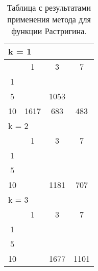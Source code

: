\begin{table}
  \centering
  \begin{tabular}{|*4{c|}}
  \hline
  \multicolumn{4}{|l|}{k = 1} \\
  \hline
  \diagbox{$\mu$}{$\lambda$} & \multicolumn{1}{c|}{1} & \multicolumn{1}{c|}{3} & \multicolumn{1}{c|}{7} \\
  \hline
  1& \cellcolor{olive}{5124} & \cellcolor{olive}{2301} & \cellcolor{olive}{1411} \\
  \hline
  5& \cellcolor{olive}{1859} & 1053 & \cellcolor{olive}{401} \\
  \hline
  10 & 1617 & 683 & 483 \\
  \hline
  \multicolumn{4}{|l|}{k = 2} \\
  \hline
  \diagbox{$\mu$}{$\lambda$} & \multicolumn{1}{c|}{1} & \multicolumn{1}{c|}{3} & \multicolumn{1}{c|}{7} \\
  \hline
  1& \cellcolor{olive}{5165} & \cellcolor{olive}{3461} & \cellcolor{olive}{1753} \\
  \hline
  5& \cellcolor{olive}{1990} & \cellcolor{olive}{1396} & \cellcolor{olive}{934} \\
  \hline
  10& \cellcolor{olive}{2022} & 1181 & 707 \\
  \hline
  \multicolumn{4}{|l|}{k = 3} \\
  \hline
  \diagbox{$\mu$}{$\lambda$} & \multicolumn{1}{c|}{1} & \multicolumn{1}{c|}{3} & \multicolumn{1}{c|}{7} \\
  \hline
  1& \cellcolor{olive}{6535}& \cellcolor{olive}{3391}& \cellcolor{olive}{2573} \\
  \hline
  5& \cellcolor{olive}{3148}& \cellcolor{olive}{1721}& \cellcolor{olive}{1231} \\
  \hline
  10& \cellcolor{olive}{2352} & 1677 & 1101 \\
  \hline
  \end{tabular}
  \captionsetup{justification=centering}
  \caption{Таблица с результатами применения метода  для функции Растригина.}
\end{table}

